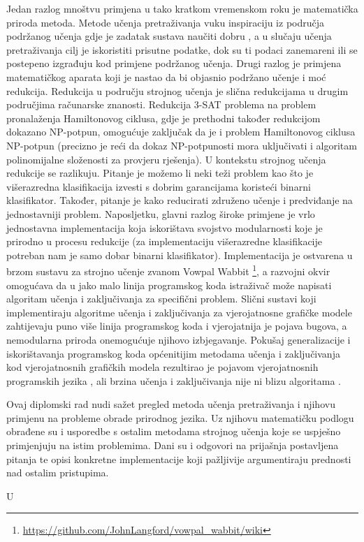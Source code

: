 Jedan razlog mnoštvu primjena u tako kratkom vremenskom roku je matematička
priroda metoda. Metode učenja pretraživanja vuku inspiraciju iz područja
podržanog učenja  gdje je zadatak sustava naučiti
dobru , a u slučaju učenja
pretraživanja cilj je iskoristiti prisutne podatke, dok su ti podaci zanemareni
ili se postepeno izgrađuju kod primjene podržanog učenja. Drugi razlog je
primjena matematičkog aparata koji je nastao da bi objasnio podržano učenje i
moć redukcija. Redukcija u području strojnog učenja je slična redukcijama u
drugim područjima računarske znanosti. Redukcija 3-SAT problema na problem
pronalaženja Hamiltonovog ciklusa, gdje je prethodni također redukcijom dokazano
NP-potpun, omogućuje zaključak da je i problem Hamiltonovog ciklusa NP-potpun
(precizno je reći da dokaz NP-potpunosti mora uključivati i algoritam
polinomijalne složenosti za provjeru rješenja). U kontekstu strojnog učenja
redukcije se razlikuju. Pitanje je možemo li neki teži problem kao što je
višerazredna klasifikacija izvesti s dobrim garancijama koristeći binarni
klasifikator. Također, pitanje je kako reducirati združeno učenje i predviđanje
 na jednostavniji problem. Naposljetku,
glavni razlog široke primjene je vrlo jednostavna implementacija koja
iskorištava svojstvo modularnosti koje je prirodno u procesu redukcije (za
implementaciju višerazredne klasifikacije potreban nam je samo dobar binarni
klasifikator). Implementacija je ostvarena u brzom sustavu za strojno učenje
zvanom Vowpal Wabbit
\footnote{\url{https://github.com/JohnLangford/vowpal_wabbit/wiki}}, a \lts{}
razvojni okvir omogućava da u jako malo linija programskog koda istraživač može
napisati algoritam učenja i zaključivanja za specifični problem. Slični sustavi
koji implementiraju algoritme učenja i zaključivanja za vjerojatnosne grafičke
modele zahtijevaju puno više linija programskog koda i vjerojatnija je pojava
bugova, a nemodularna priroda onemogućuje njihovo izbjegavanje. Pokušaj
generalizacije i iskorištavanja programskog koda općenitijim metodama učenja i
zaključivanja kod vjerojatnosnih grafičkih modela rezultirao je pojavom
vjerojatnosnih programskih jezika ,
ali brzina učenja i zaključivanja nije ni blizu algoritama \lts{}.

Ovaj diplomski rad nudi sažet pregled metoda učenja pretraživanja i njihovu
primjenu na probleme obrade prirodnog jezika. Uz njihovu matematičku podlogu
obrađene su i usporedbe s ostalim metodama strojnog učenja koje se uspješno
primjenjuju na istim problemima. Dani su i odgovori na prijašnja postavljena
pitanja te opisi konkretne implementacije koji pažljivije argumentiraju
prednosti nad ostalim pristupima.

U 
